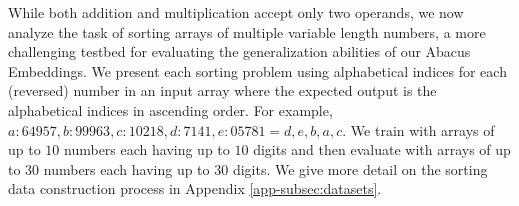 \documentclass{article}
\begin{document}


While both addition and multiplication accept only two operands, we now analyze the task of sorting arrays of multiple variable length numbers, a more challenging testbed for evaluating the generalization abilities of our Abacus Embeddings.
We present each sorting problem using alphabetical indices for each (reversed) number in an input array where the expected output is the alphabetical indices in ascending order. For example, 
\(a:64957,b:99963,c:10218,d:7141,e:05781=d,e,b,a,c\).
We train with arrays of up to \(10\) numbers each having up to \(10\) digits and then evaluate with arrays of up to \(30\) numbers each having up to \(30\) digits.
We give more detail on the sorting data construction process in Appendix \ref{app-subsec:datasets}.
\end{document}
